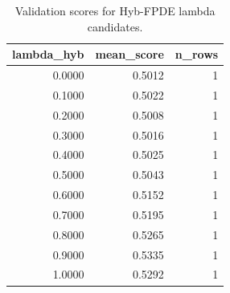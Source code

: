 \begin{table}[t]
\caption{Validation scores for Hyb-FPDE lambda candidates.}
\label{tab:lambda_distribution_computed}
\centering
\begin{tabular}{rrr}
\toprule
lambda\_hyb & mean\_score & n\_rows \\
\midrule
0.0000 & 0.5012 & 1 \\
0.1000 & 0.5022 & 1 \\
0.2000 & 0.5008 & 1 \\
0.3000 & 0.5016 & 1 \\
0.4000 & 0.5025 & 1 \\
0.5000 & 0.5043 & 1 \\
0.6000 & 0.5152 & 1 \\
0.7000 & 0.5195 & 1 \\
0.8000 & 0.5265 & 1 \\
0.9000 & 0.5335 & 1 \\
1.0000 & 0.5292 & 1 \\
\bottomrule
\end{tabular}

\end{table}
